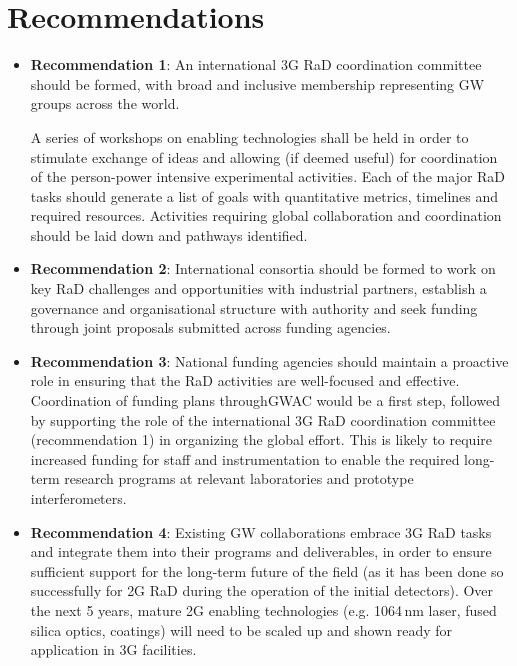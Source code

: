 \section{Recommendations}
\begin{itemize}
\item \textbf{Recommendation 1}:  An international \ac{3G} \ac{RaD} coordination committee should be formed, with broad and inclusive membership representing \ac{GW} groups across the world.

 A series of workshops on enabling technologies shall be held in order to stimulate exchange of ideas and allowing (if deemed useful) for coordination of the person-power intensive experimental activities.  Each of the major \ac{RaD} tasks should generate a list of  goals with quantitative metrics,  timelines and required resources.   Activities requiring global collaboration and coordination should be laid down and pathways identified.

\item \textbf{Recommendation 2}:  International consortia should be formed to work on key \ac{RaD} challenges and opportunities with industrial partners, establish a governance and organisational structure with authority and seek funding through joint proposals submitted across funding agencies.
\pagebreak
\item \textbf{Recommendation 3}: 
National funding agencies should maintain a proactive role in ensuring that the \ac{RaD} activities are well-focused and effective.  Coordination of funding plans through\ac{GWAC} would be a first step, followed by supporting the role of the international \ac{3G} \ac{RaD} coordination committee (recommendation 1) in organizing the global effort.  This is likely to require increased funding for staff and instrumentation to enable the required long-term research programs at relevant laboratories and prototype interferometers.

\item \textbf{Recommendation 4}: Existing \ac{GW} collaborations embrace \ac{3G} \ac{RaD} tasks and integrate them into their programs and deliverables, in order to ensure sufficient support for the long-term future of the field (as it has been done so successfully for \ac{2G} \ac{RaD} during the operation of the initial detectors). Over the next 5 years, mature \ac{2G} enabling technologies (e.g. 1064\,nm laser, fused silica optics, coatings) will need to be scaled up and shown ready for application in \ac{3G} facilities.



\end{itemize}

